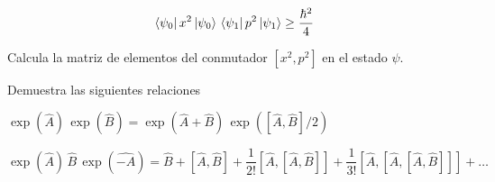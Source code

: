 \begin{milista}
\begin{milista}
\begin{align*}
\bra{\psi_{0}} x^{2} \ket{\psi_{0}} \, \bra{\psi_{1}} p^{2} \ket{\psi_{1}} \geq \dfrac{\hbar^{2}}{4}
\end{align*}
\item Calcula la matriz de elementos del conmutador $[x^{2}, p^{2}]$ en el estado $\psi$.
\end{milista}
\item Demuestra las siguientes relaciones
\begin{milista}
\item $\exp(\hat{A}) \, \exp(\hat{B}) = \exp(\hat{A} + \hat{B}) \, \exp([\hat{A}, \hat{B}]/2)$
\item $\exp(\hat{A}) \, \hat{B} \, \exp(\hat{-A}) = \hat{B} + [\hat{A}, \hat{B}] + \dfrac{1}{2!} [\hat{A}, [\hat{A}, \hat{B}]] + \dfrac{1}{3!} [\hat{A}, [ \hat{A}, [\hat{A}, \hat{B}]]] + \ldots$
\end{milista}
\end{milista}
